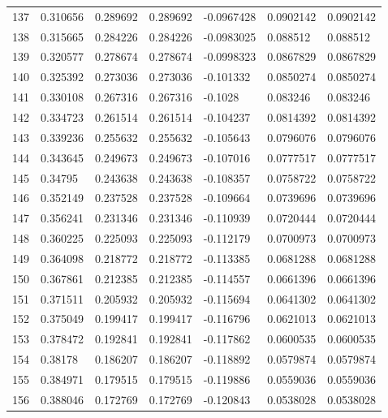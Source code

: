 \begin{longtable}{l|lll|lll}
 137 &  0.310656    & 0.289692    & 0.289692    & -0.0967428   & 0.0902142   & 0.0902142   \\
 138 &  0.315665    & 0.284226    & 0.284226    & -0.0983025   & 0.088512    & 0.088512    \\
 139 &  0.320577    & 0.278674    & 0.278674    & -0.0998323   & 0.0867829   & 0.0867829   \\
 140 &  0.325392    & 0.273036    & 0.273036    & -0.101332    & 0.0850274   & 0.0850274   \\
 141 &  0.330108    & 0.267316    & 0.267316    & -0.1028      & 0.083246    & 0.083246    \\
 142 &  0.334723    & 0.261514    & 0.261514    & -0.104237    & 0.0814392   & 0.0814392   \\
 143 &  0.339236    & 0.255632    & 0.255632    & -0.105643    & 0.0796076   & 0.0796076   \\
 144 &  0.343645    & 0.249673    & 0.249673    & -0.107016    & 0.0777517   & 0.0777517   \\
 145 &  0.34795     & 0.243638    & 0.243638    & -0.108357    & 0.0758722   & 0.0758722   \\
 146 &  0.352149    & 0.237528    & 0.237528    & -0.109664    & 0.0739696   & 0.0739696   \\
 147 &  0.356241    & 0.231346    & 0.231346    & -0.110939    & 0.0720444   & 0.0720444   \\
 148 &  0.360225    & 0.225093    & 0.225093    & -0.112179    & 0.0700973   & 0.0700973   \\
 149 &  0.364098    & 0.218772    & 0.218772    & -0.113385    & 0.0681288   & 0.0681288   \\
 150 &  0.367861    & 0.212385    & 0.212385    & -0.114557    & 0.0661396   & 0.0661396   \\
 151 &  0.371511    & 0.205932    & 0.205932    & -0.115694    & 0.0641302   & 0.0641302   \\
 152 &  0.375049    & 0.199417    & 0.199417    & -0.116796    & 0.0621013   & 0.0621013   \\
 153 &  0.378472    & 0.192841    & 0.192841    & -0.117862    & 0.0600535   & 0.0600535   \\
 154 &  0.38178     & 0.186207    & 0.186207    & -0.118892    & 0.0579874   & 0.0579874   \\
 155 &  0.384971    & 0.179515    & 0.179515    & -0.119886    & 0.0559036   & 0.0559036   \\
 156 &  0.388046    & 0.172769    & 0.172769    & -0.120843    & 0.0538028   & 0.0538028   \\

\end{longtable}
